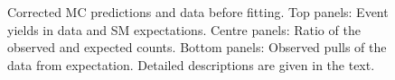 \begin{figure}[!h]
{  }\\
  ~ 
  \\
  \caption{\label{fig:no-fit} Corrected MC predictions and data before fitting.
  Top panels:  Event yields in data and SM expectations.
  Centre panels:  Ratio of the observed and expected counts.
  Bottom panels:  Observed pulls of the data from expectation.
  Detailed descriptions are given in the text.
	}
\end{figure}

